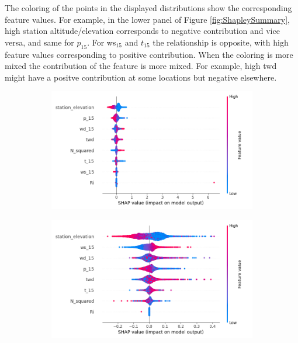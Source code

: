 The coloring of the points in the displayed distributions show the corresponding feature values. For example, in the lower panel of Figure \ref{fig:ShapleySummary}, high station altitude/elevation corresponds to negative contribution and vice versa, and same for $p_{15}$. For ws$_{15}$ and $t_{15}$ the relationship is opposite, with high feature values corresponding to positive contribution. When the coloring is more mixed the contribution of the feature is more mixed. For example, high twd might have a positve contribution at some locations but negative elsewhere.

\begin{figure}
  \centering
  \begin{subfigure}{0.85\textwidth}
    \includegraphics[width=\textwidth]{Figures/shap_plots/summary_plot.png}
    \label{fig:ShapleySummarySmallerSet}
  \end{subfigure}
  \vspace{0.5cm}
  \begin{subfigure}{0.85\textwidth}
    \includegraphics[width=\textwidth]{Figures/shap_plots/summary_plot_190924_.png}

\end{subfigure}
\end{figure}
